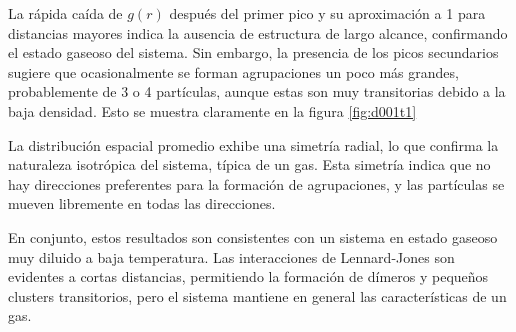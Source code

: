 \vspace{\baselineskip}
	
La rápida caída de $g(r)$ después del primer pico y su aproximación a 1 para distancias mayores indica la ausencia de estructura de largo alcance, confirmando el estado gaseoso del sistema. Sin embargo, la presencia de los picos secundarios sugiere que ocasionalmente se forman agrupaciones un poco más grandes, probablemente de 3 o 4 partículas, aunque estas son muy transitorias debido a la baja densidad. Esto se muestra claramente en la figura \ref{fig:d001t1}
	
\vspace{\baselineskip}
	
La distribución espacial promedio exhibe una simetría radial, lo que confirma la naturaleza isotrópica del sistema, típica de un gas. Esta simetría indica que no hay direcciones preferentes para la formación de agrupaciones, y las partículas se mueven libremente en todas las direcciones.
	
\vspace{\baselineskip}
	
En conjunto, estos resultados son consistentes con un sistema en estado gaseoso muy diluido a baja temperatura. Las interacciones de Lennard-Jones son evidentes a cortas distancias, permitiendo la formación de dímeros y pequeños clusters transitorios, pero el sistema mantiene en general las características de un gas. 
	

